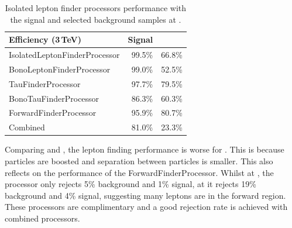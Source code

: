 \begin{table}[!tbp]
\begin{tabular}{lrr}
\hline
\hline
Efficiency (3\,TeV)  &  Signal  & \HepProcess{\Pep \Pem \to \Pquark\Pquark\Pquark\Pquark\Plepton\Pnu} \\
\hline
IsolatedLeptonFinderProcessor & 99.5\% & 66.8\%  \\
BonoLeptonFinderProcessor & 99.0\% & 52.5\%  \\
TauFinderProcessor & 97.7\% & 79.5\%  \\
BonoTauFinderProcessor & 86.3\% & 60.3\%  \\
ForwardFinderProcessor & 95.9\% & 80.7\%  \\
\hline
Combined & 81.0\% & 23.3\%  \\
\hline
\hline

\end{tabular}
\caption{Isolated lepton finder processors performance with the signal and selected background samples at .}
\label{tab:doubleHiggs3TeVIsoLepPerformance}
\end{table}


Comparing  and , the lepton finding performance is worse for . This is because particles are  boosted and separation between particles is smaller. This also reflects on the performance of the  ForwardFinderProcessor. Whilst at , the processor only rejects 5\% \HepProcess{\Pep \Pem \to \Pquark\Pquark\Pquark\Pquark\Plepton\Pnu} background and 1\% signal, at  it rejects 19\% background and 4\% signal, suggesting many leptons are in the forward region. These processors are complimentary and a good rejection rate is achieved with combined processors.

